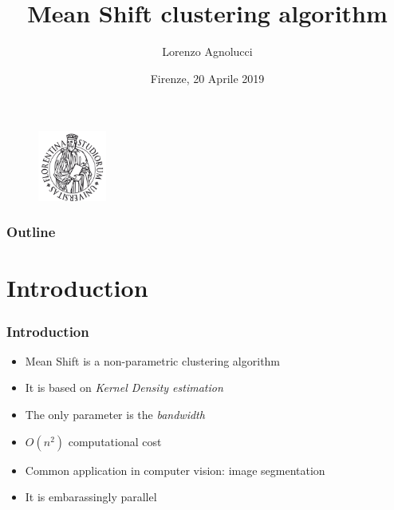 \documentclass[xcolor=table]{beamer}
\title[Mean Shift clustering algorithm]{Mean Shift clustering algorithm} %
\author{Lorenzo Agnolucci} %
\institute[] %
{
Universit\`a degli Studi di Firenze \\ %
Dipartimento di Ingegneria dell'Informazione \\
}
\date{Firenze, 20 Aprile 2019} %
\begin{document}
\begin{frame}
\titlepage %
\begin{figure}
    \centering
    \includegraphics[width=0.2\textwidth]{img/stemma.pdf}
\end{figure}
\end{frame}


\begin{frame}
\frametitle{Outline}
\tableofcontents
\end{frame}


\section{Introduction}

\begin{frame}
\frametitle{Introduction}
\begin{itemize}
\item Mean Shift is a non-parametric clustering algorithm
\vspace{0.35cm}
\item It is based on \emph{Kernel Density estimation}
\vspace{0.35cm}
\item The only parameter is the \emph{bandwidth}
\vspace{0.35cm}
\item $O(n ^{2})$ computational cost
\vspace{0.35cm}
\item Common application in computer vision: image segmentation
\vspace{0.35cm}
\item It is embarassingly parallel
\end{itemize}

\end{frame}

\end{document}
